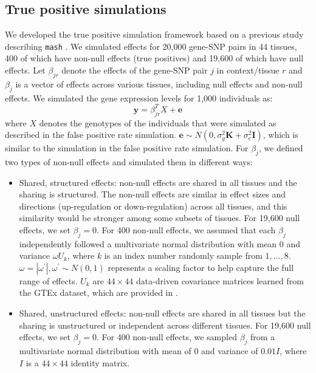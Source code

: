     \subsection{True positive simulations}
        We developed the true positive simulation framework based on a previous study describing \texttt{mash} \cite{Urbut2019}. We simulated effects for 20,000 gene-SNP pairs in 44 tissues, 400 of which have non-null effects (true positives) and 19,600 of which have null effects. Let $\beta_{jr}$ denote the effects of the gene-SNP pair $j$ in context/tissue $r$ and $\beta_j$ is a vector of effects across various tissues, including null effects and non-null effects. We simulated the gene expression levels for 1,000 individuals as:
            \begin{equation}
                \mathbf{y} = \beta_{jr}^T X + \mathbf{e}
            \end{equation}
        where $X$ denotes the genotypes of the individuals that were simulated as described in the false positive rate simulation. $\mathbf{e} \sim N(0,\sigma_g^2\mathbf{K} + \sigma_e^2\mathbf{I})$, which is similar to the simulation in the false positive rate simulation. For $\beta_j$, we defined two types of non-null effects and simulated them in different ways:
        \begin{itemize}
            \item Shared, structured effects: non-null effects are shared in all tissues and the sharing is structured. The non-null effects are similar in effect sizes and directions (up-regulation or down-regulation) across all tissues, and this similarity would be stronger among some subsets of tissues. For 19,600 null effects, we set $\beta_j=0$. For 400 non-null effects, we assumed that each $\beta_j$ independently followed a multivariate normal distribution with mean 0 and variance $\omega U_k$,
            where $k$ is an index number randomly sample from ${1,\ldots,8}$. $\omega = |\omega^\prime|, \omega^\prime \sim N(0, 1)$ represents a scaling factor to help capture the full range of effects. $U_k$ are $44 \times 44$ data-driven covariance matrices learned from the GTEx dataset, which are provided in \cite{Urbut2019}.
            \item Shared, unstructured effects: non-null effects are shared in all tissues but the sharing is unstructured or independent across different tissues. For 19,600 null effects, we set $\beta_j=0$. For 400 non-null effects, we sampled $\beta_j$ from a multivariate normal distribution with mean of 0 and variance of $0.01I$, where $I$ is a $44 \times 44$ identity matrix.
        \end{itemize}
        
